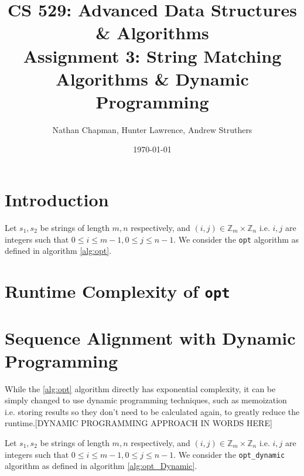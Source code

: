 \documentclass{article}
\title{\vspace*{-0.625in}CS 529: Advanced Data Structures \& Algorithms \\ Assignment 3: String Matching Algorithms \& Dynamic Programming}
\author{Nathan Chapman, Hunter Lawrence, Andrew Struthers}
\date{\today}
\renewcommand{\_}{\ifincsname_\else\legacyunderscore\fi}
\newcommand{\integer}{\textbf{int} }
\begin{document}
    \maketitle

    \section*{Introduction}

        Let $s_1, s_2$ be strings of length $m, n$ respectively, and $(i, j) \in \mathbb{Z}_m \times \mathbb{Z}_n$ i.e. $i, j$ are integers such that $0 \leq i \leq m - 1, 0 \leq j \leq n - 1$.  We consider the \texttt{opt} algorithm as defined in algorithm \ref{alg:opt}.

        \begin{function}
            \caption{opt(\integer $i$, \integer $j$)}
            \label{alg:opt}
            
        \end{function}

    \section*{Runtime Complexity of \texttt{opt}}

\pagebreak
    \section*{Sequence Alignment with Dynamic Programming}

        While the \ref{alg:opt} algorithm directly has exponential complexity, it can be simply changed to use dynamic programming techniques, such as memoization i.e. storing results so they don't need to be calculated again, to greatly reduce the runtime.[DYNAMIC PROGRAMMING APPROACH IN WORDS HERE]

        Let $s_1, s_2$ be strings of length $m, n$ respectively, and $(i, j) \in \mathbb{Z}_m \times \mathbb{Z}_n$ i.e. $i, j$ are integers such that $0 \leq i \leq m - 1, 0 \leq j \leq n - 1$.  We consider the \texttt{opt\_dynamic} algorithm as defined in algorithm \ref{alg:opt_Dynamic}.
\end{document}
